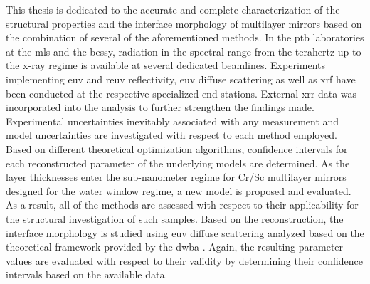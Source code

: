 This thesis is dedicated to the accurate and complete characterization of the structural properties and the interface morphology of multilayer mirrors based on the combination of several of the aforementioned methods. In the \gls{ptb} laboratories at the \gls{mls} and the \gls{bessy}, radiation in the spectral range from the terahertz up to the x-ray regime is available at several dedicated beamlines. Experiments implementing \gls{euv} and \gls{reuv} reflectivity, \gls{euv} diffuse scattering as well as \gls{xrf} have been conducted at the respective specialized end stations. External \gls{xrr} data was incorporated into the analysis to further strengthen the findings made. Experimental uncertainties inevitably associated with any measurement and model uncertainties are investigated with respect to each method employed. Based on different theoretical optimization algorithms, confidence intervals for each reconstructed parameter of the underlying models are determined. As the layer thicknesses enter the sub-nanometer regime for Cr/Sc multilayer mirrors designed for the water window regime, a new model is proposed and evaluated. As a result, all of the methods are assessed with respect to their applicability for the structural investigation of such samples. Based on the reconstruction, the interface morphology is studied using \gls{euv} diffuse scattering analyzed based on the theoretical framework provided by the \gls{dwba} \cite{holy_nonspecular_1994, holy_x-ray_1993}. Again, the resulting parameter values are evaluated with respect to their validity by determining their confidence intervals based on the available data.


